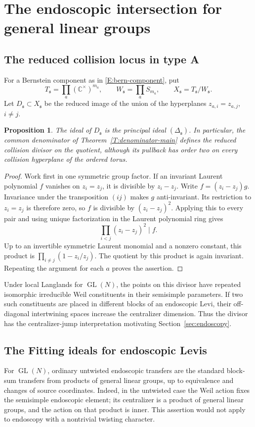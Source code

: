 \documentclass[11pt,a4paper]{amsart}
\newtheorem{proposition}[theorem]{Proposition}
\theoremstyle{definition}
\theoremstyle{remark}
\DeclareMathOperator{\GL}{GL}
\newcommand{\grs}{\mathfrak s}
\begin{document}
\section{The endoscopic intersection for general linear groups}
\label{sec:intersection-typeA}
\subsection{The reduced collision locus in type A}
For a Bernstein component as in \eqref{E:bern-component}, put
$$
 T_{\grs}=\prod_a(\mathbb C^\times)^{m_a},\qquad
 W_{\grs}=\prod_a S_{m_a},\qquad
 X_{\grs}=T_{\grs}/W_{\grs}.
$$
Let $D_{\grs}\subset X_{\grs}$ be the reduced image of the union of
the hyperplanes $z_{a,i}=z_{a,j}$, $i\ne j$.
\begin{proposition}\label{prop:reduced-discriminant}
The ideal of $D_{\grs}$ is the principal ideal $(\Delta_{\grs})$.
In particular, the common denominator of
Theorem~\ref{T:denominator-main} defines the reduced collision divisor
on the quotient, although its pullback has order two on every
collision hyperplane of the ordered torus.
\end{proposition}
\begin{proof}
Work first in one symmetric group factor. If an invariant Laurent
polynomial $f$ vanishes on $z_i=z_j$, it is divisible by $z_i-z_j$.
Write $f=(z_i-z_j)g$. Invariance under the transposition $(ij)$ makes
$g$ anti-invariant. Its restriction to $z_i=z_j$ is therefore zero,
so $f$ is divisible by $(z_i-z_j)^2$. Applying this to every pair and
using unique factorization in the Laurent polynomial ring gives
$$
 \prod_{i<j}(z_i-z_j)^2\mid f.
$$
Up to an invertible symmetric Laurent monomial and a nonzero constant,
this product is $\prod_{i\ne j}(1-z_i/z_j)$. The quotient by this
product is again invariant. Repeating the argument for each $a$ proves
the assertion.
\end{proof}

Under local Langlands for $\GL(N)$, the points on this divisor have
repeated isomorphic irreducible Weil constituents in their semisimple
parameters. If two such constituents are placed in different blocks of
an endoscopic Levi, their off-diagonal intertwining spaces increase
the centralizer dimension. Thus the divisor has the centralizer-jump
interpretation motivating Section~\ref{sec:endoscopy}.

\subsection{The Fitting ideals for endoscopic Levis}
For $\GL(N)$, ordinary untwisted endoscopic transfers are the standard
block-sum transfers from products of general linear groups, up to
equivalence and changes of source coordinates. Indeed, in the
untwisted case the Weil action fixes the semisimple endoscopic element;
its centralizer is a product of general linear groups, and the action
on that product is inner. This assertion would not apply to endoscopy
with a nontrivial twisting character.
\end{document}
